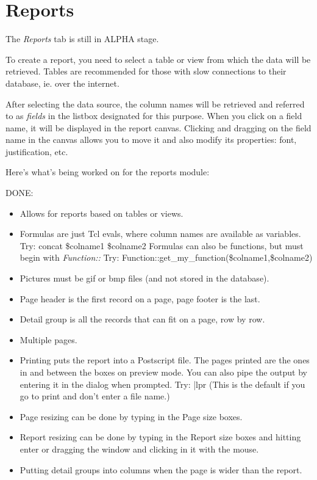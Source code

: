 \section{Reports}
The \emph{Reports} tab is still in ALPHA stage.

To create a report, you need to select a table or view from which the data will be retrieved.  Tables are recommended for those with slow connections to their database, ie. over the internet.

After selecting the data source, the column names will be retrieved and referred to as \emph{fields} in the listbox designated for this purpose.  When you click on a field name, it will be displayed in the report canvas.  Clicking and dragging on the field name in the canvas allows you to move it and also modify its properties: font, justification, etc.

Here's what's being worked on for the reports module:

DONE:
\begin{itemize}
\item Allows for reports based on tables or views.
\item Formulas are just Tcl evals, where column names are available as variables.
  Try: concat \$colname1 \$colname2
  Formulas can also be functions, but must begin with \emph{Function::}
  Try: Function::get\_my\_function(\$colname1,\$colname2)
\item Pictures must be gif or bmp files (and not stored in the database).
\item Page header is the first record on a page, page footer is the last.
\item Detail group is all the records that can fit on a page, row by row.
\item Multiple pages.
\item Printing puts the report into a Postscript file.
  The pages printed are the ones in and between the boxes on preview mode.
  You can also pipe the output by entering it in the dialog when prompted.
  Try: |lpr
  (This is the default if you go to print and don't enter a file name.)
\item Page resizing can be done by typing in the Page size boxes.
\item Report resizing can be done by typing in the Report size boxes and hitting
enter or dragging the window and clicking in it with the mouse.
\item Putting detail groups into columns when the page is wider than the report.
\end{itemize}

